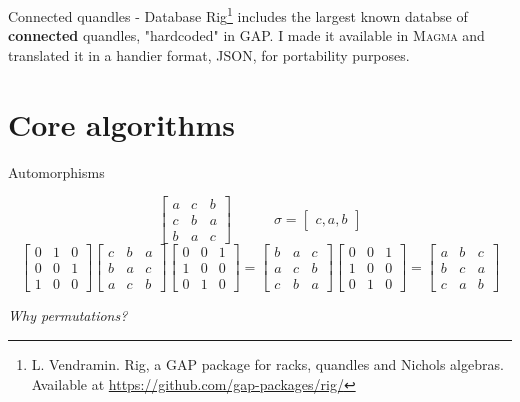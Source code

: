 \begin{frame}{Connected quandles - Database}
Rig\footnote{L. Vendramin. Rig, a GAP package for racks, quandles and Nichols algebras. Available at \href{https://github.com/gap-packages/rig/}{https://github.com/gap-packages/rig/} \newline} includes the largest known databse of \textbf{connected} quandles, "hardcoded" in GAP.\newline\newline
I made it available in \textsc{Magma} and translated it in a handier format, JSON, for portability purposes.
\end{frame}

\section{Core algorithms}
\frame{\sectionpage}
\begin{frame}{Automorphisms}

\[\begin{bmatrix}
a& c & b \\
c & b & a\\
b & a& c
\end{bmatrix} \hspace{3em}\sigma = \begin{bmatrix}
c, a, b
\end{bmatrix}\]\vspace{1em}
\[\begin{bmatrix}
0& 1 & 0 \\
0 & 0 & 1\\
1 & 0& 0
\end{bmatrix} \begin{bmatrix}
c& b & a \\
b & a & c\\
a & c& b
\end{bmatrix} \begin{bmatrix}
0& 0 & 1 \\
1 & 0 & 0\\
0 & 1& 0
\end{bmatrix} =\begin{bmatrix}
b & a & c \\
a & c & b\\
c & b & a
\end{bmatrix}  \begin{bmatrix}
0& 0 & 1 \\
1 & 0 & 0\\
0 & 1& 0
\end{bmatrix}=\begin{bmatrix}
a& b & c \\
b & c & a\\
c & a& b
\end{bmatrix}\]\vspace{1em}
\begin{center}
    \emph{Why permutations?}
\end{center}

\end{frame}

